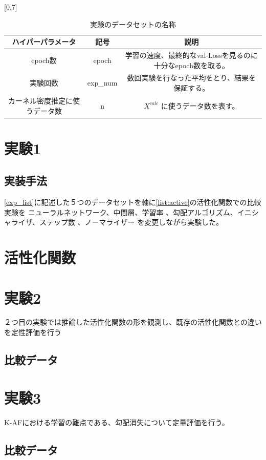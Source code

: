 \begin{table}[htbp]
    \begin{center}
        \caption{実験のデータセットの名称}
        \vspace{5mm} 
        \scalebox{0.7}[0.7]{
            \begin{tabular}{||c | c |c||}
            ハイパーパラメータ & 記号 & 説明 \\
            \hline
            epoch数                           & epoch       & 学習の速度、最終的なval-Lossを見るのに十分なepoch数を取る。  \\
            実験回数                           & exp\_num     & 数回実験を行なった平均をとり、結果を保証する。 \\
            カーネル密度推定に使うデータ数        & n           & $ X^{calc} $ に使うデータ数を表す。  \\
            \end{tabular}
        }
    \end{center}
\end{table}



\section{実験1}

\subsection{実装手法}

\ref{exp_list}に記述した５つのデータセットを軸に\ref{list:active}の活性化関数での比較実験を
ニューラルネットワーク、中間層、学習率 、勾配アルゴリズム、イニシャライザ、ステップ数 、ノーマライザー
を変更しながら実験した。


\section{活性化関数}




\section{実験2}
\label{exp2}
２つ目の実験では推論した活性化関数の形を観測し、既存の活性化関数との違いを定性評価を行う
\subsection{比較データ}


\section{実験3}
\label{exp3}
K-AFにおける学習の難点である、勾配消失について定量評価を行う。
\subsection{比較データ}


